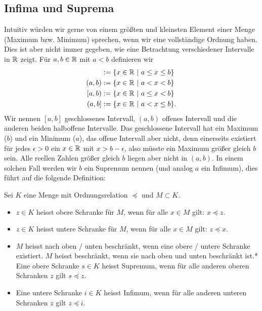 \subsection{Infima und Suprema}
\label{\detokenize{grundlagen/zahlensysteme:infima-und-suprema}}
Intuitiv würden wir gerne von einem größten und kleinsten Element einer Menge (Maximum bzw. Minimum) sprechen, wenn wir eine vollständige Ordnung haben. Dies ist aber nicht immer gegeben, wie eine Betrachtung verschiedener Intervalle in \(\mathbb{R}\) zeigt. Für \(a,b \in \mathbb{R}\) mit \(a < b\) definieren wir
\begin{align*}
[a,b] &:= \{x \in \R~|~a \leq x \leq b\} \\
(a,b) &:= \{x \in \R~|~a < x < b\} \\
[a,b) &:= \{x \in \R~|~a \leq x < b\} \\
(a,b] &:= \{x \in \R~|~a < x \leq b\}.
\end{align*}
Wir nennen \([a,b]\) geschlossenes Intervall, \((a,b)\) offenes Intervall und die anderen beiden halboffene Intervalle. Das geschlossene Intervall hat ein Maximum (\(b\)) und ein Minimum (\(a\)), das offene Intervall aber nicht, denn einerseits existiert für jedes \(\epsilon > 0\) ein \(x \in \mathbb{R}\) mit \(x>b-\epsilon\), also müsste ein Maximum größer gleich \(b\) sein. Alle reellen Zahlen größer gleich \(b\) liegen aber nicht in \((a,b)\). In einem solchen Fall werden wir \(b\) ein Supremum nennen (und analog \(a\) ein Infimum), dies führt auf die folgende Definition:
\label{grundlagen/zahlensysteme:definition-27}
\begin{definition}{}{}



Sei \(K\) eine Menge mit Ordnungsrelation \(\preceq\) und \(M \subset K\).
\begin{itemize}
\item {} 
\(z \in K\) heisst obere Schranke für \(M\), wenn für alle \(x \in M\) gilt: \(x \preceq z\).

\item {} 
\(z \in K\) heisst untere Schranke für \(M\), wenn für alle \(x \in M\) gilt: \(z \preceq x\).

\item {} 
\(M\) heisst nach oben / unten beschränkt, wenn eine obere / untere Schranke existiert. \(M\) heisst beschränkt, wenn sie nach oben und unten beschränkt ist.* Eine obere Schranke \(s \in K\) heisst Supremum, wenn für alle anderen oberen Schranken \(z\) gilt \(s \preceq z\).

\item {} 
Eine untere Schranke \(i \in K\) heisst Infimum, wenn für alle anderen unteren Schranken \(z\) gilt \(z \preceq i\).

\end{itemize}
\end{definition}

